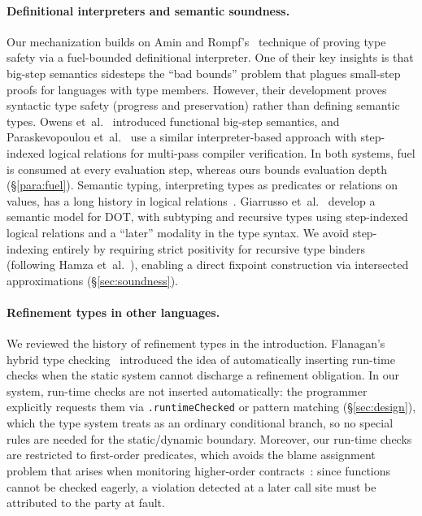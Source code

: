 \documentclass[acmsmall]{acmart}
\begin{document}
\paragraph{Definitional interpreters and semantic soundness.}
Our mechanization builds on Amin and Rompf's~\cite{amin2017} technique of proving type safety via a fuel-bounded definitional interpreter. One of their key insights is that big-step semantics sidesteps the ``bad bounds'' problem that plagues small-step proofs for languages with type members. However, their development proves syntactic type safety (progress and preservation) rather than defining semantic types.
%
Owens et~al.~\cite{owens2016} introduced functional big-step semantics, and Paraskevopoulou et~al.~\cite{paraskevopoulou2021} use a similar interpreter-based approach with step-indexed logical relations for multi-pass compiler verification. In both systems, fuel is consumed at every evaluation step, whereas ours bounds evaluation depth (\S\ref{para:fuel}).
%
Semantic typing, interpreting types as predicates or relations on values, has a long history in logical relations~\cite{timany2024}. Giarrusso et~al.~\cite{giarrusso2020} develop a semantic model for DOT, with subtyping and recursive types using step-indexed logical relations and a ``later'' modality in the type syntax. We avoid step-indexing entirely by requiring strict positivity for recursive type binders (following Hamza et~al.~\cite{hamza2019}), enabling a direct fixpoint construction via intersected approximations (\S\ref{sec:soundness}).

\paragraph{Refinement types in other languages.}
We reviewed the history of refinement types in the introduction. Flanagan's hybrid type checking~\cite{flanagan2006} introduced the idea of automatically inserting run-time checks when the static system cannot discharge a refinement obligation. In our system, run-time checks are not inserted automatically: the programmer explicitly requests them via \lstinline!.runtimeChecked! or pattern matching (\S\ref{sec:design}), which the type system treats as an ordinary conditional branch, so no special rules are needed for the static/dynamic boundary. Moreover, our run-time checks are restricted to first-order predicates, which avoids the blame assignment problem that arises when monitoring higher-order contracts~\cite{keil2015}: since functions cannot be checked eagerly, a violation detected at a later call site must be attributed to the party at fault.
\end{document}
